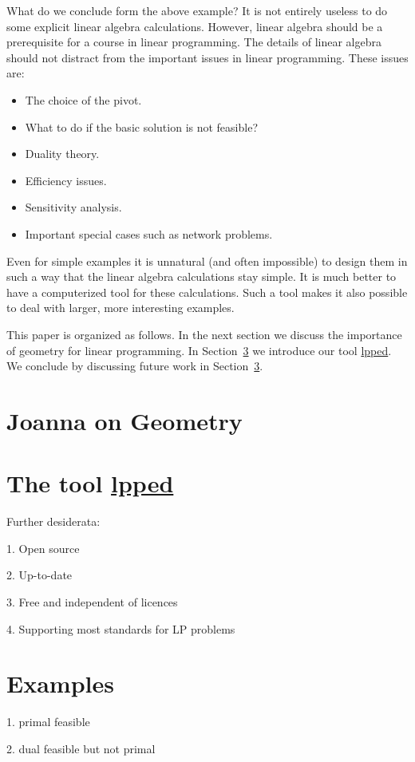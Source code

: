 \documentclass[ukenglish]{nik}
\begin{document}
What do we conclude form the above example? It is not entirely useless to do some explicit
linear algebra calculations. However, linear algebra should be a prerequisite for a course
in linear programming. The details of linear algebra should not distract from the important
issues in linear programming. These issues are:
\begin{itemize}
\item The choice of the pivot.
\item What to do if the basic solution is not feasible?
\item Duality theory.
\item Efficiency issues.
\item Sensitivity analysis.
\item Important special cases such as network problems.
\end{itemize}
Even for simple examples it is unnatural (and often impossible)
to design them in such a way that the linear algebra calculations stay simple.
It is much better to have a computerized tool for these calculations. Such a tool makes
it also possible to deal with larger, more interesting examples. 

This paper is organized as follows. In the next section we discuss the importance of
geometry for linear programming. In Section~\ref{} we introduce our tool \url{lpped}.
We conclude by discussing future work in Section~\ref{}.

\section{Joanna on Geometry}

\section{The tool \url{lpped}}



Further desiderata:

1. Open source

2. Up-to-date

3. Free and independent of licences

4. Supporting most standards for LP problems

\section{Examples}
1. primal feasible

2. dual feasible but not primal
\end{document}
